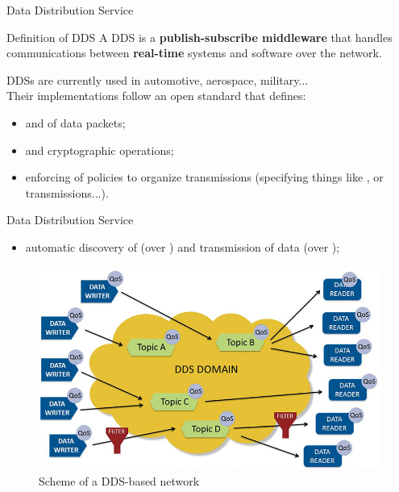 \begin{frame}{Data Distribution Service}
	\begin{block}{Definition of DDS}
		A DDS is a \textbf{publish-subscribe middleware} that handles communications between \textbf{real-time} systems and software over the network.
	\end{block}
  DDSs are currently used in automotive, aerospace, military...\\
	Their implementations follow an open standard that defines:
	\begin{itemize}
		\item {} and  of data packets;
		\item {} and cryptographic operations;
		\item enforcing of  policies to organize transmissions (specifying things like ,  or  transmissions...).
	\end{itemize}
\end{frame}
\begin{frame}{Data Distribution Service}
  \begin{itemize}
		\item automatic discovery of  (over ) and transmission of data (over );
  \end{itemize}
	\begin{figure}
		\centering
		\includegraphics[scale=.36]{ddsDomain.jpg}
		\caption{Scheme of a DDS-based network}
		\label{fig:ddsdomain}
	\end{figure}
\end{frame}

